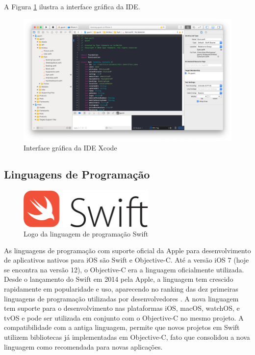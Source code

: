 A Figura \ref{fig:xcode} ilustra a interface gráfica da IDE.
\begin{figure}[h]
    \centering
    \includegraphics[width=\textwidth]{pfc/figuras/xcode.png}
    \caption{Interface gráfica da IDE Xcode}
    \label{fig:xcode}
\end{figure}

\subsection{Linguagens de Programação}
\begin{figure}[h]
    \centering
    \includegraphics[width=0.6\textwidth]{pfc/figuras/swift.png}
    \caption{Logo da linguagem de programação Swift}
    \label{fig:swift}
\end{figure}
As linguagens de programação com suporte oficial da Apple para desenvolvimento de aplicativos nativos para iOS são Swift e Objective-C. Até a versão iOS 7 (hoje se encontra na versão 12), o Objective-C era a linguagem oficialmente utilizada. Desde o lançamento do Swift em 2014 pela Apple, a linguagem tem crescido rapidamente em popularidade e uso, aparecendo no ranking das dez primeiras linguagens de programação utilizadas por desenvolvedores \cite{redmonk}. A nova linguagem tem suporte para o desenvolvimento nas plataformas iOS, macOS, watchOS, e tvOS e pode ser utilizada em conjunto com o Objective-C no mesmo projeto. A compatibilidade com a antiga linguagem, permite que novos projetos em Swift utilizem bibliotecas já implementadas em Objective-C, fato que consolidou a nova linguagem como recomendada para novas aplicações.

